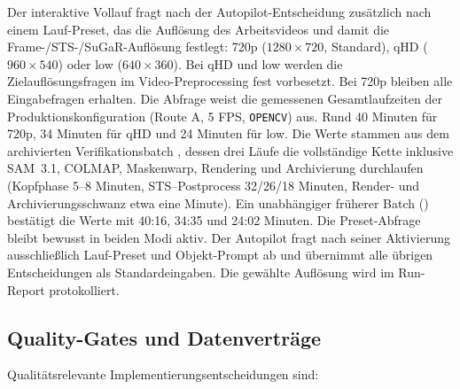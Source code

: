 Der interaktive Vollauf fragt nach der Autopilot-Entscheidung zusätzlich nach
einem Lauf-Preset, das die Auflösung des Arbeitsvideos und damit die
Frame-/STS-/SuGaR-Auflösung festlegt: 720p ($1280\times720$, Standard),
qHD ($960\times540$) oder low ($640\times360$). Bei qHD und low werden die
Zielauflösungsfragen im Video-Preprocessing fest vorbesetzt. Bei 720p bleiben
alle Eingabefragen erhalten. Die Abfrage weist die gemessenen Gesamtlaufzeiten
der Produktionskonfiguration (Route A, 5 FPS,
\texttt{OPENCV}) aus. Rund 40 Minuten für 720p, 34 Minuten für qHD und
24 Minuten für low. Die Werte stammen aus dem archivierten
Verifikationsbatch , dessen drei Läufe
die vollständige Kette inklusive SAM~3.1, COLMAP, Maskenwarp, Rendering und
Archivierung durchlaufen (Kopfphase 5--8 Minuten, STS--Postprocess
32/26/18 Minuten, Render- und Archivierungsschwanz etwa eine Minute). Ein
unabhängiger früherer Batch ()
bestätigt die Werte mit 40:16, 34:35 und 24:02 Minuten. Die
Preset-Abfrage bleibt bewusst in beiden Modi
aktiv. Der Autopilot fragt nach seiner Aktivierung ausschließlich Lauf-Preset
und Objekt-Prompt ab und übernimmt alle übrigen Entscheidungen als
Standardeingaben. Die gewählte Auflösung wird im Run-Report protokolliert.

\subsection{Quality-Gates und Datenverträge}

Qualitätsrelevante Implementierungsentscheidungen sind:

